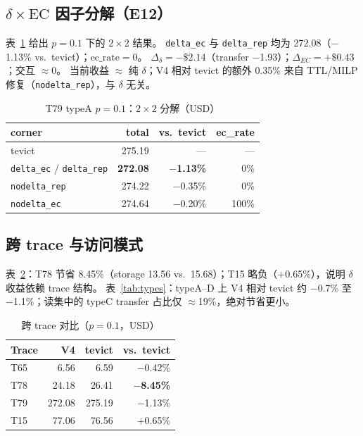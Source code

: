 \documentclass[conference]{IEEEtran}
\begin{document}
\subsection{$\delta{\times}\mathrm{EC}$ 因子分解（E12）}

表~\ref{tab:22results} 给出 $p{=}0.1$ 下的 $2{\times}2$ 结果。
\texttt{delta\_ec} 与 \texttt{delta\_rep} 均为 272.08（$-$1.13\% vs.\ tevict）；$\mathrm{ec\_rate}{=}0$。
$\Delta_\delta{=}{-}\$2.14$（transfer $-$1.93）；$\Delta_{EC}{=}{+}\$0.43$；交互 $\approx 0$。
当前收益 $\approx$ 纯 $\delta$；V4 相对 tevict 的额外 0.35\% 来自 TTL/MILP 修复（\texttt{nodelta\_rep}），与 $\delta$ 无关。

\begin{table}[t]
\centering
\caption{T79 typeA $p{=}0.1$：$2{\times}2$ 分解（USD）}
\label{tab:22results}
\begin{tabular}{lrrr}
\toprule
corner & total & vs.\ tevict & ec\_rate \\
\midrule
tevict & 275.19 & --- & --- \\
\texttt{delta\_ec} / \texttt{delta\_rep} & \textbf{272.08} & \textbf{$-$1.13\%} & 0\% \\
\texttt{nodelta\_rep} & 274.22 & $-$0.35\% & 0\% \\
\texttt{nodelta\_ec} & 274.64 & $-$0.20\% & 100\% \\
\bottomrule
\end{tabular}
\end{table}

\subsection{跨 trace 与访问模式}

表~\ref{tab:cross}：T78 节省 8.45\%（storage 13.56 vs.\ 15.68）；T15 略负（$+$0.65\%），说明 $\delta$ 收益依赖 trace 结构。
表~\ref{tab:types}：typeA--D 上 V4 相对 tevict 约 $-$0.7\% 至 $-$1.1\%；读集中的 typeC transfer 占比仅 $\approx$19\%，绝对节省更小。

\begin{table}[t]
\centering
\caption{跨 trace 对比（$p{=}0.1$，USD）}
\label{tab:cross}
\begin{tabular}{lrrr}
\toprule
Trace & V4 & tevict & vs.\ tevict \\
\midrule
T65 & 6.56  & 6.59  & $-$0.42\% \\
T78 & 24.18 & 26.41 & \textbf{$-$8.45\%} \\
T79 & 272.08 & 275.19 & $-$1.13\% \\
T15 & 77.06 & 76.56 & $+$0.65\% \\
\bottomrule
\end{tabular}
\end{table}
\end{document}
